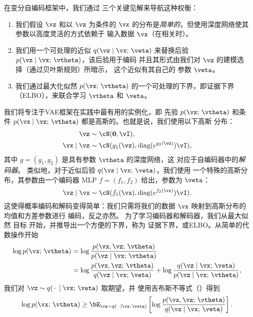 \documentclass[../../book-main_zh.tex]{subfiles}
\begin{document}
在变分自编码框架中，我们通过
三个关键见解来导航这种权衡：
\begin{enumerate}
\item 我们假设 $\vz$ 和以 $\vz$ 为条件的 $\vx$ 的分布是\textit{简单的}，但使用深度网络使其参数以高度灵活的方式依赖于
  输入数据 $\vx$（在相关时）。
\item 我们用一个可处理的近似 $q(\vz \mid \vx;\, \veta)$ 来替换后验 $p(\vz \mid \vx;\, \vtheta)$，该后验用于编码
  并且其形式由我们对 $\vz$ 的建模选择（通过贝叶斯规则）所暗示，
  这个近似有其自己的
  参数 $\veta$。
\item 我们通过最大化似然 $p(\vx ;\, \vtheta)$ 的一个可处理的下界，即证据下界（ELBO），来联合学习 $\vtheta$ 和 $\veta$。
\end{enumerate}
我们将专注于VAE框架在实践中最有用的实例化，即
先验 $p(\vz ;\, \vtheta)$ 和条件 $p(\vx \mid \vz;\,
\vtheta)$ 都是高斯的。也就是说，我们使用以下高斯
分布：
\begin{align*}
\vz &\sim \cN(\Zero, \vI), \\
\vx \mid \vz &\sim \cN(g_1(\vz), \diag(e^{g_2(\vz)}) \vI),
\end{align*}
其中 $g = (g_1, g_2)$ 是具有参数 $\vtheta$ 的深度网络，这
对应于自编码器中的\textit{解码器}。
类似地，对于近似后验 $q(\vz \mid \vx;\, \veta)$，我们使用
一个特殊的高斯分布，其参数由一个编码器
MLP $f = (f_1, f_2)$ 给出，参数为 $\veta$：
\begin{equation*}
\vz \mid \vx \sim \cN(f_1(\vx), \diag(e^{f_2(\vx)}) \vI).
\end{equation*}
这使得概率编码和解码变得简单：我们只需将我们的数据
$\vx$ 映射到高斯分布的均值和方差参数进行
编码，反之亦然。
为了学习编码器和解码器，我们从最大似然
目标  开始，并推导出一个方便的下界，称为
证据下界，或ELBO。从简单的代数操作开始
\begin{align*}
\log p(\vx;\, \vtheta) &=
\log \frac{p(\vx, \vz;\, \vtheta)}{p(\vz \mid \vx;\, \vtheta)}
\\
&=
\log \frac{p(\vx, \vz;\, \vtheta)}{q(\vz \mid \vx;\, \veta)}
+
\log \frac{q(\vz \mid \vx;\, \veta)}{p(\vz \mid \vx;\, \vtheta)},
\end{align*}
我们对 $\vz \sim q(\,\cdot\, \mid
\vx;\, \veta)$ 取期望，并
使用吉布斯不等式（）得到
\begin{equation*}
\log p(\vx;\, \vtheta)
\geq
\bE_{\vz \sim q(\,\cdot\, \mid \vx ;\, \veta)} \left[
  \log \frac{p(\vx, \vz;\, \vtheta)}{q(\vz \mid \vx;\, \veta)}
\right].
\end{equation*}
\end{document}
